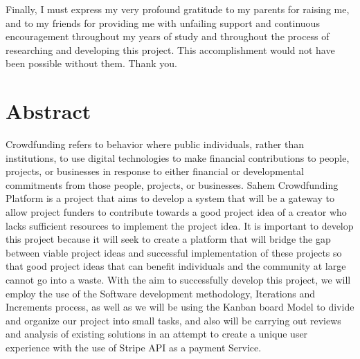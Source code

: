 Finally, I must express my very profound gratitude to my parents for raising me, and to my friends for providing me with unfailing support and continuous encouragement throughout my years of study and throughout the process of researching and developing this project.
This accomplishment would not have been possible without them. Thank you.

\cleardoublepage%
\chapter*{Abstract}
\thispagestyle{empty}

Crowdfunding refers to behavior where public individuals, rather than institutions, to use digital
technologies to make financial contributions to people, projects, or businesses in response to
either financial or developmental commitments from those people, projects, or businesses.
Sahem Crowdfunding Platform is a project that aims to develop a system that will be a gateway to allow project funders to
contribute towards a good project idea of a creator who lacks sufficient resources to implement
the project idea. It is important to develop this project because it will seek to create a platform
that will bridge the gap between viable project ideas and successful implementation of these
projects so that good project ideas that can benefit individuals and the community at large cannot
go into a waste.
With the aim to successfully develop this project, we will employ the use of the Software
development methodology, Iterations and Increments process, as well as we will be using the Kanban board Model
to divide and organize our project into small tasks, and also will be carrying out reviews and analysis of existing solutions in an attempt to
create a unique user experience with the use of Stripe API as a payment Service.
